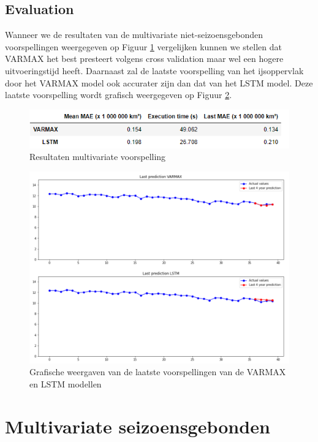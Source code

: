 \subsection{Evaluation}

Wanneer we de resultaten van de multivariate niet-seizoensgebonden voorspellingen weergegeven op Figuur \ref{fig:mvnsresult} vergelijken kunnen we stellen dat VARMAX het best presteert volgens cross validation maar wel een hogere uitvoeringstijd heeft. Daarnaast zal de laatste voorspelling van het ijsoppervlak door het VARMAX model ook accurater zijn dan dat van het LSTM model. Deze laatste voorspelling wordt grafisch weergegeven op Figuur \ref{fig:mvnsresultgraph}.

\begin{figure}
    \centering
    \caption{Resultaten multivariate voorspelling}
    \label{fig:mvnsresult}
    \includegraphics[width=1\linewidth]{mv_ns_result}
\end{figure}

\begin{figure}
    \centering
    \caption{Grafische weergaven van de laatste voorspellingen van de VARMAX en LSTM modellen}
    \label{fig:mvnsresultgraph}
    \includegraphics[width=1\linewidth]{mv_ns_result_graph}
\end{figure}



\section{Multivariate seizoensgebonden}

